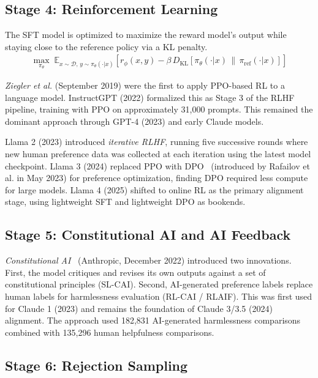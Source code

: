 \documentclass[12pt]{article}
\begin{document}
\subsection{Stage 4: Reinforcement Learning}

The SFT model is optimized to maximize the reward model's output while staying close to the reference policy via a KL penalty.
\begin{align}
\max_{\pi_\theta} \; \mathbb{E}_{x \sim \mathcal{D},\, y \sim \pi_\theta(\cdot|x)} \left[ r_\phi(x, y) - \beta \, D_{\text{KL}}\!\left[\pi_\theta(\cdot|x) \,\|\, \pi_{\text{ref}}(\cdot|x)\right] \right]
\label{eq:rlhf_objective}
\end{align}

\textit{Ziegler et al.} (September 2019) were the first to apply PPO-based RL to a language model. InstructGPT (2022) formalized this as Stage 3 of the RLHF pipeline, training with PPO on approximately 31,000 prompts. This remained the dominant approach through GPT-4 (2023) and early Claude models.

Llama 2 (2023) introduced \textit{iterative RLHF}, running five successive rounds where new human preference data was collected at each iteration using the latest model checkpoint. Llama 3 (2024) replaced PPO with DPO~\cite{Rafailov2023DPO} (introduced by Rafailov et al. in May 2023) for preference optimization, finding DPO required less compute for large models. Llama 4 (2025) shifted to online RL as the primary alignment stage, using lightweight SFT and lightweight DPO as bookends.

\subsection{Stage 5: Constitutional AI and AI Feedback}

\textit{Constitutional AI}~\cite{Bai2022Constitutional} (Anthropic, December 2022) introduced two innovations. First, the model critiques and revises its own outputs against a set of constitutional principles (SL-CAI). Second, AI-generated preference labels replace human labels for harmlessness evaluation (RL-CAI / RLAIF). This was first used for Claude 1 (2023) and remains the foundation of Claude 3/3.5 (2024) alignment. The approach used 182,831 AI-generated harmlessness comparisons combined with 135,296 human helpfulness comparisons.

\subsection{Stage 6: Rejection Sampling}
\end{document}
